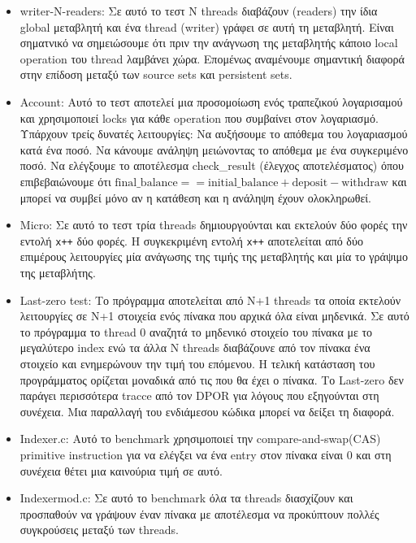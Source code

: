 \begin{itemize}
\item writer-N-readers: Σε αυτό το τεστ N threads διαβάζουν (readers) την ίδια global μεταβλητή και ένα thread (writer)
γράφει σε αυτή τη μεταβλητή. Είναι σηματνικό να σημειώσουμε ότι πριν την ανάγνωση της μεταβλητής κάποιο local operation του thread λαμβάνει
χώρα. Επομένως αναμένουμε σημαντική διαφορά στην επίδοση μεταξύ των source sets και persistent sets.

\item Account: Αυτό το τεστ αποτελεί μια προσομοίωση ενός τραπεζικού λογαρισαμού και χρησιμοποιεί locks για κάθε operation που συμβαίνει
    στον λογαριασμό. Υπάρχουν τρείς δυνατές λειτουργίες: Να αυξήσουμε το απόθεμα του λογαριασμού κατά ένα ποσό. Να κάνουμε ανάληψη μειώνοντας
    το απόθεμα με ένα συγκεριμένο ποσό. Να ελέγξουμε το αποτέλεσμα check\_result (έλεγχος αποτελέσματος) όπου επιβεβαιώνουμε ότι $\text{final\_balance} ==
\text{initial\_balance} + \text{deposit} - \text{withdraw}$ και μπορεί να συμβεί μόνο αν η κατάθεση και η ανάληψη έχουν ολοκληρωθεί.

\item Micro: Σε αυτό το τεστ τρία threads δημιουργούνται και εκτελούν δύο φορές την εντολή \verb|x++| δύο φορές. Η συγκεκριμένη εντολή \verb|x++|
αποτελείται από δύο επιμέρους λειτουργίες μία ανάγωσης της τιμής της μεταβλητής και μία το γράψιμο της μεταβλήτης.

\item Last-zero test: Το πρόγραμμα αποτελείται από N+1 threads τα οποία εκτελούν λειτουργίες σε N+1 στοιχεία ενός πίνακα που αρχικά όλα είναι μηδενικά.
Σε αυτό το πρόγραμμα το thread 0 αναζητά το μηδενικό στοιχείο του πίνακα με το μεγαλύτερο index ενώ τα άλλα N threads
διαβάζουνε από τον πίνακα ένα στοιχείο και ενημερώνουν την τιμή του επόμενου. Η τελική κατάσταση του προγράμματος ορίζεται μοναδικά από τις που θα 
έχει ο πίνακα. Το Last-zero δεν παράγει περισσότερα tracce από τον DPOR για λόγους που εξηγούνται στη συνέχεια. Μια παραλλαγή του ενδιάμεσου
κώδικα μπορεί να δείξει τη διαφορά.

\item Indexer.c: Αυτό το benchmark χρησιμοποιεί την compare-and-swap(CAS) primitive instruction για να ελέγξει να ένα entry στον
    πίνακα είναι 0 και στη συνέχεια θέτει μια καινούρια τιμή σε αυτό.

\item Indexermod.c: Σε αυτό το benchmark όλα τα threads διασχίζουν και προσπαθούν να γράψουν έναν πίνακα με αποτέλεσμα να προκύπτουν
    πολλές συγκρούσεις μεταξύ των threads.

\end{itemize}

